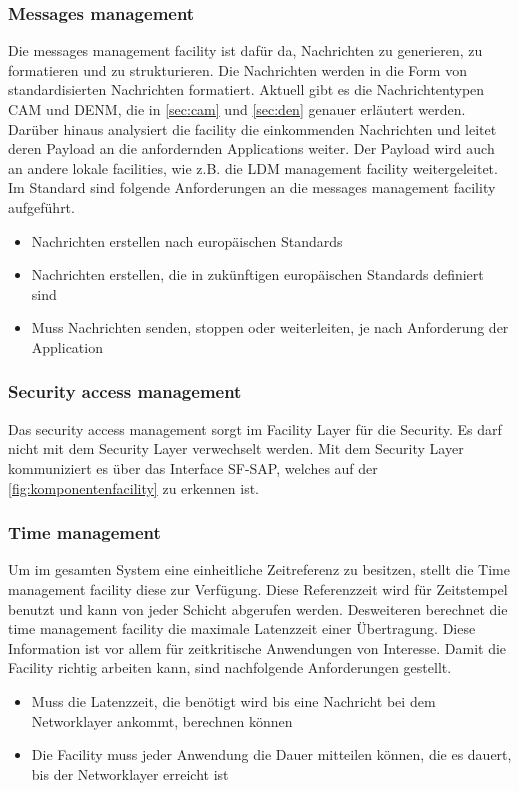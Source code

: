 \subsubsection{Messages management \label{facilitylayer_MessagesManagement}}
Die messages management facility ist dafür da, Nachrichten zu generieren, zu formatieren und zu strukturieren. Die Nachrichten werden in die Form von standardisierten Nachrichten formatiert. Aktuell gibt es die Nachrichtentypen \ac{CAM} und \ac{DENM}, die in \autoref{sec:cam} und \autoref{sec:den} genauer erläutert werden. Darüber hinaus analysiert die facility die einkommenden Nachrichten und leitet deren Payload an die anfordernden Applications weiter. Der Payload wird auch an andere lokale facilities, wie z.B. die \ac{LDM} management facility weitergeleitet. Im Standard  \cite{etsi102638} sind folgende Anforderungen an die messages management facility aufgeführt.
\begin{itemize}
\item Nachrichten erstellen nach europäischen Standards
\item Nachrichten erstellen, die in zukünftigen europäischen Standards definiert sind
\item Muss Nachrichten senden, stoppen oder weiterleiten, je nach Anforderung der Application
\end{itemize}

\subsubsection{Security access management \label{facilitylayer_AccessManagement}}
Das security access management sorgt im Facility Layer für die Security. Es darf nicht mit dem Security Layer verwechselt werden. Mit dem Security Layer kommuniziert es über das Interface SF-SAP, welches auf der \autoref{fig:komponentenfacility} zu erkennen ist. 

\subsubsection{Time management \label{facilitylayer_TimeManagement}}
Um im gesamten System eine einheitliche Zeitreferenz zu besitzen, stellt die Time management facility diese zur Verfügung. Diese Referenzzeit wird für Zeitstempel benutzt und kann von jeder Schicht abgerufen werden. Desweiteren  berechnet die time management facility die maximale Latenzzeit einer Übertragung. Diese Information ist vor allem für zeitkritische Anwendungen von Interesse.
Damit die Facility richtig arbeiten kann, sind nachfolgende Anforderungen gestellt.
\begin{itemize}
	\item Muss die Latenzzeit, die benötigt wird bis eine Nachricht bei dem Networklayer ankommt, berechnen können
	\item Die Facility muss jeder Anwendung die Dauer mitteilen können, die es dauert, bis der Networklayer erreicht ist
\end{itemize}

